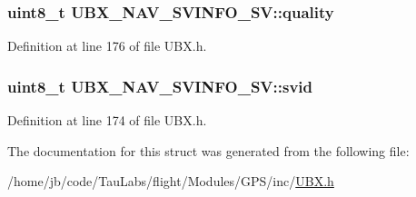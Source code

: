 \hypertarget{struct_u_b_x___n_a_v___s_v_i_n_f_o___s_v_a3d99d4c098bc0ba52408def4080330c5}{
\subsubsection[{quality}]{\setlength{\rightskip}{0pt plus 5cm}uint8\-\_\-t {\bf \-U\-B\-X\-\_\-\-N\-A\-V\-\_\-\-S\-V\-I\-N\-F\-O\-\_\-\-S\-V\-::quality}}}\label{struct_u_b_x___n_a_v___s_v_i_n_f_o___s_v_a3d99d4c098bc0ba52408def4080330c5}


\-Definition at line 176 of file \-U\-B\-X.\-h.

\hypertarget{struct_u_b_x___n_a_v___s_v_i_n_f_o___s_v_a95b2c35d609942ecc9257b9d1c1df03d}{
\subsubsection[{svid}]{\setlength{\rightskip}{0pt plus 5cm}uint8\-\_\-t {\bf \-U\-B\-X\-\_\-\-N\-A\-V\-\_\-\-S\-V\-I\-N\-F\-O\-\_\-\-S\-V\-::svid}}}\label{struct_u_b_x___n_a_v___s_v_i_n_f_o___s_v_a95b2c35d609942ecc9257b9d1c1df03d}


\-Definition at line 174 of file \-U\-B\-X.\-h.



\-The documentation for this struct was generated from the following file\-:\begin{DoxyCompactItemize}
\item 
/home/jb/code/\-Tau\-Labs/flight/\-Modules/\-G\-P\-S/inc/\hyperlink{_u_b_x_8h}{\-U\-B\-X.\-h}\end{DoxyCompactItemize}
